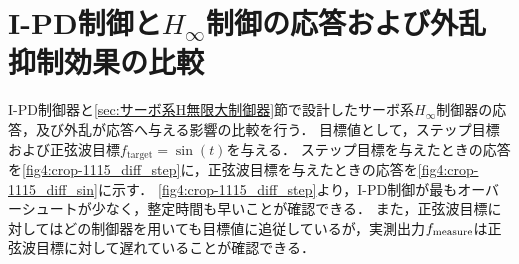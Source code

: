 \clearpage

\section{I-PD制御と$H_\infty$制御の応答および外乱抑制効果の比較}
I-PD制御器と\ref{sec:サーボ系H無限大制御器}節で設計したサーボ系$H_\infty$制御器の応答，及び外乱が応答へ与える影響の比較を行う．
目標値として，ステップ目標および正弦波目標$f_\mathrm{target} = \sin(t)$を与える．
ステップ目標を与えたときの応答を\figname\ref{fig4:crop-1115_diff_step}に，正弦波目標を与えたときの応答を\figname\ref{fig4:crop-1115_diff_sin}に示す．
\figname\ref{fig4:crop-1115_diff_step}より，I-PD制御が最もオーバーシュートが少なく，整定時間も早いことが確認できる．
また，正弦波目標に対してはどの制御器を用いても目標値に追従しているが，実測出力$f_\mathrm{measure}$は正弦波目標に対して遅れていることが確認できる．
